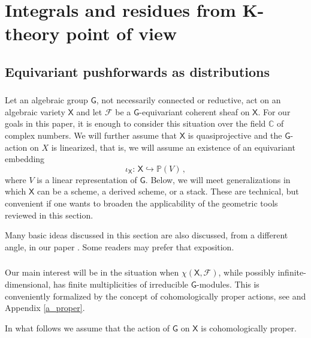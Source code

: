 \documentclass[14pt]{extarticle}
\newcommand{\C}{\mathbb{C}}
\newcommand{\bG}{\mathsf{G}}
\newcommand{\bX}{\mathsf{X}}
\newcommand{\bP}{\mathbb{P}}
\newcommand{\cF}{\mathscr{F}}
\theoremstyle{definition}
\begin{document}
\section{Integrals and residues from K-theory point of view}\label{s_geom}

\subsection{Equivariant pushforwards as distributions}

\subsubsection{} 

Let an algebraic group $\bG$, not necessarily
connected or reductive, act on an algebraic variety  $\bX$ and let $\cF$ be a
$\bG$-equivariant coherent sheaf on $\bX$. For our goals in this paper,
it is enough to consider this situation over the field $\C$ of
complex numbers. We will further assume that $\bX$
is quasiprojective and the $\bG$-action on $X$ is linearized, that is,
we will assume an existence of an equivariant embedding
%
\begin{equation}
  \label{eq:37}
  \iota_\bX : \, \bX \hookrightarrow \bP(V)\,, 
\end{equation}
%
where $V$ is a linear representation of $\bG$. Below, we will meet
generalizations in which $\bX$ can be a scheme, a
derived scheme, or a stack. These are technical, but convenient
if one wants to broaden the applicability of the geometric tools reviewed
in this section.

Many basic ideas discussed in this section are also discussed, from a
different angle, in our paper \cite{KO}. Some readers may prefer that
exposition. 
\subsubsection{} 

Our main interest will be in the situation when $\chi(\bX,\cF)$, while
possibly 
infinite-dimensional, has finite multiplicities of irreducible
$\bG$-modules. This is conveniently formalized by the concept of
cohomologically proper actions, see  \cite{DHLloc} and
Appendix \ref{a_proper}.

In what follows we assume that the action of $\bG$ on $\bX$ is
cohomologically proper. 

\subsubsection{}
\end{document}
